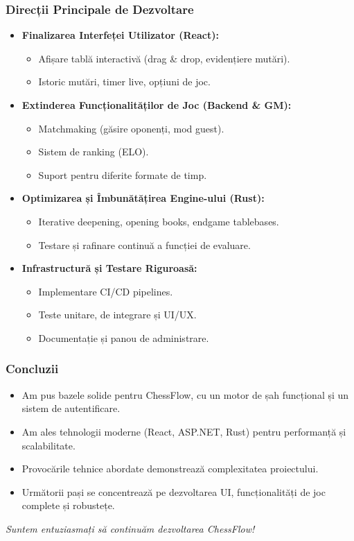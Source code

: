 \documentclass{beamer}
\begin{document}
\begin{frame}
    \frametitle{Direcții Principale de Dezvoltare}
    \begin{itemize}
        \item \textbf{Finalizarea Interfeței Utilizator (React):}
        \begin{itemize}
            \item Afișare tablă interactivă (drag & drop, evidențiere mutări).
            \item Istoric mutări, timer live, opțiuni de joc.
        \end{itemize}
        \item \textbf{Extinderea Funcționalităților de Joc (Backend \& GM):}
        \begin{itemize}
            \item Matchmaking (găsire oponenți, mod guest).
            \item Sistem de ranking (ELO).
            \item Suport pentru diferite formate de timp.
        \end{itemize}
        \item \textbf{Optimizarea și Îmbunătățirea Engine-ului (Rust):}
        \begin{itemize}
            \item Iterative deepening, opening books, endgame tablebases.
            \item Testare și rafinare continuă a funcției de evaluare.
        \end{itemize}
        \item \textbf{Infrastructură și Testare Riguroasă:}
        \begin{itemize}
            \item Implementare CI/CD pipelines.
            \item Teste unitare, de integrare și UI/UX.
            \item Documentație și panou de administrare.
        \end{itemize}
    \end{itemize}
\end{frame}

\begin{frame}
    \frametitle{Concluzii}
    \begin{itemize}
        \item Am pus bazele solide pentru ChessFlow, cu un motor de șah funcțional și un sistem de autentificare.
        \item Am ales tehnologii moderne (React, ASP.NET, Rust) pentru performanță și scalabilitate.
        \item Provocările tehnice abordate demonstrează complexitatea proiectului.
        \item Următorii pași se concentrează pe dezvoltarea UI, funcționalități de joc complete și robustețe.
    \end{itemize}
    \vfill
    \begin{center}
        \textit{Suntem entuziasmați să continuăm dezvoltarea ChessFlow!}
    \end{center}
\end{frame}
\end{document}

